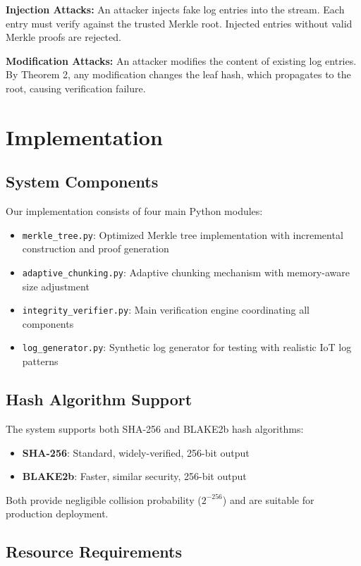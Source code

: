 \documentclass[a4paper,10pt]{article}
\begin{document}
\textbf{Injection Attacks:} An attacker injects fake log entries into the stream. Each entry must verify against the trusted Merkle root. Injected entries without valid Merkle proofs are rejected.

\textbf{Modification Attacks:} An attacker modifies the content of existing log entries. By Theorem 2, any modification changes the leaf hash, which propagates to the root, causing verification failure.

\section{Implementation}
\label{sec:implementation}

\subsection{System Components}

Our implementation consists of four main Python modules:

\begin{itemize}
\item \texttt{merkle\_tree.py}: Optimized Merkle tree implementation with incremental construction and proof generation
\item \texttt{adaptive\_chunking.py}: Adaptive chunking mechanism with memory-aware size adjustment
\item \texttt{integrity\_verifier.py}: Main verification engine coordinating all components
\item \texttt{log\_generator.py}: Synthetic log generator for testing with realistic IoT log patterns
\end{itemize}

\subsection{Hash Algorithm Support}

The system supports both SHA-256 and BLAKE2b hash algorithms:
\begin{itemize}
\item \textbf{SHA-256}: Standard, widely-verified, 256-bit output
\item \textbf{BLAKE2b}: Faster, similar security, 256-bit output
\end{itemize}

Both provide negligible collision probability ($2^{-256}$) and are suitable for production deployment.

\subsection{Resource Requirements}
\end{document}
